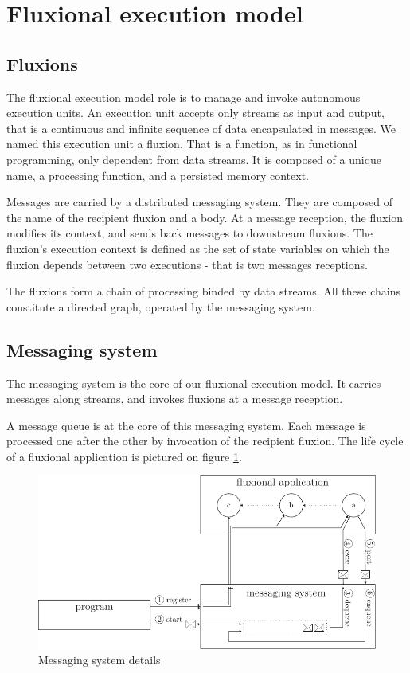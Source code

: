 \section{Fluxional execution model} \label{section:model}

\subsection{Fluxions}

The fluxional execution model role is to manage and invoke autonomous execution units.
An execution unit accepts only streams as input and output, that is a continuous and infinite sequence of data encapsulated in messages.
We named this execution unit a fluxion.
That is a function, as in functional programming, only dependent from data streams.
It is composed of a unique name, a processing function, and a persisted memory context.

Messages are carried by a distributed messaging system.
They are composed of the name of the recipient fluxion and a body.
At a message reception, the fluxion modifies its context, and sends back messages to downstream fluxions.
The fluxion's execution context is defined as the set of state variables on which the fluxion depends between two executions - that is two messages receptions.

The fluxions form a chain of processing binded by data streams.
All these chains constitute a directed graph, operated by the messaging system.

\subsection{Messaging system}

The messaging system is the core of our fluxional execution model.
It carries messages along streams, and invokes fluxions at a message reception.

A message queue is at the core of this messaging system.
Each message is processed one after the other by invocation of the recipient fluxion.
The life cycle of a fluxional application is pictured on figure \ref{fig:MesSys}.

\begin{figure}[h!]
  \includegraphics[width=\linewidth]{ressources/schema-message.pdf}
  \caption{Messaging system details}
  \label{fig:MesSys}
\end{figure}

